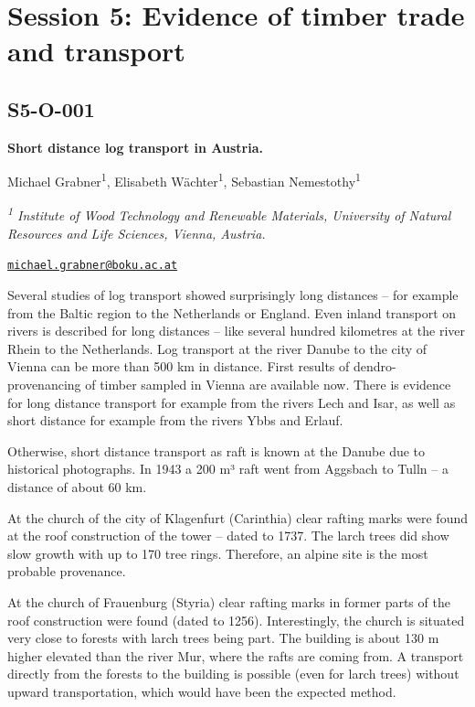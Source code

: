 \documentclass[
]{book}
\begin{document}
\hypertarget{session-5-evidence-of-timber-trade-and-transport}{%
\chapter*{Session 5: Evidence of timber trade and transport}\label{session-5-evidence-of-timber-trade-and-transport}}

\hypertarget{s5-o-001}{%
\section*{S5-O-001}\label{s5-o-001}}

\textbf{Short distance log transport in Austria.}

Michael Grabner\textsuperscript{1}, Elisabeth Wächter\textsuperscript{1}, Sebastian Nemestothy\textsuperscript{1}

\emph{\textsuperscript{1} Institute of Wood Technology and Renewable Materials, University of Natural Resources and Life Sciences, Vienna, Austria.}

\href{mailto:michael.grabner@boku.ac.at}{\nolinkurl{michael.grabner@boku.ac.at}}

Several studies of log transport showed surprisingly long distances -- for example from the Baltic region to the Netherlands or England. Even inland transport on rivers is described for long distances -- like several hundred kilometres at the river Rhein to the Netherlands. Log transport at the river Danube to the city of Vienna can be more than 500 km in distance. First results of dendro-provenancing of timber sampled in Vienna are available now. There is evidence for long distance transport for example from the rivers Lech and Isar, as well as short distance for example from the rivers Ybbs and Erlauf.

Otherwise, short distance transport as raft is known at the Danube due to historical photographs. In 1943 a 200 m³ raft went from Aggsbach to Tulln -- a distance of about 60 km.

At the church of the city of Klagenfurt (Carinthia) clear rafting marks were found at the roof construction of the tower -- dated to 1737. The larch trees did show slow growth with up to 170 tree rings. Therefore, an alpine site is the most probable provenance.

At the church of Frauenburg (Styria) clear rafting marks in former parts of the roof construction were found (dated to 1256). Interestingly, the church is situated very close to forests with larch trees being part. The building is about 130 m higher elevated than the river Mur, where the rafts are coming from. A transport directly from the forests to the building is possible (even for larch trees) without upward transportation, which would have been the expected method.
\end{document}
